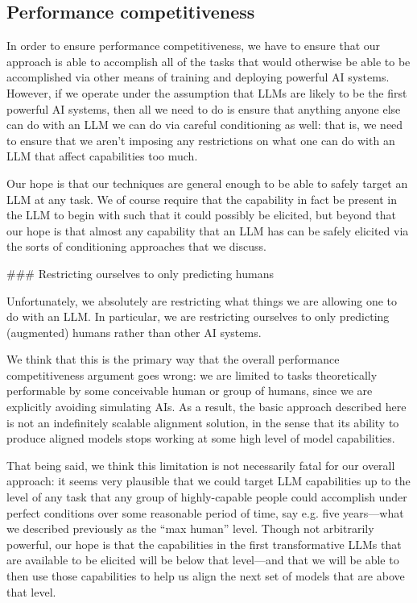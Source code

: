 {\subsection{Performance competitiveness}

In order to ensure performance competitiveness, we have to ensure that our approach is able to accomplish all of the tasks that would otherwise be able to be accomplished via other means of training and deploying powerful AI systems. However, if we operate under the assumption that LLMs are likely to be the first powerful AI systems, then all we need to do is ensure that anything anyone else can do with an LLM we can do via careful conditioning as well: that is, we need to ensure that we aren't imposing any restrictions on what one can do with an LLM that affect capabilities too much.

Our hope is that our techniques are general enough to be able to safely target an LLM at any task. We of course require that the capability in fact be present in the LLM to begin with such that it could possibly be elicited, but beyond that our hope is that almost any capability that an LLM has can be safely elicited via the sorts of conditioning approaches that we discuss.


### Restricting ourselves to only predicting humans

Unfortunately, we absolutely are restricting what things we are allowing one to do with an LLM. In particular, we are restricting ourselves to only predicting (augmented) humans rather than other AI systems.

We think that this is the primary way that the overall performance competitiveness argument goes wrong: we are limited to tasks theoretically performable by some conceivable human or group of humans, since we are explicitly avoiding simulating AIs. As a result, the basic approach described here is not an indefinitely scalable alignment solution, in the sense that its ability to produce aligned models stops working at some high level of model capabilities.

That being said, we think this limitation is not necessarily fatal for our overall approach: it seems very plausible that we could target LLM capabilities up to the level of any task that any group of highly-capable people could accomplish under perfect conditions over some reasonable period of time, say e.g. five years---what we described previously as the ``max human'' level. Though not arbitrarily powerful, our hope is that the capabilities in the first transformative LLMs that are available to be elicited will be below that level---and that we will be able to then use those capabilities to help us align the next set of models that are above that level.

}

